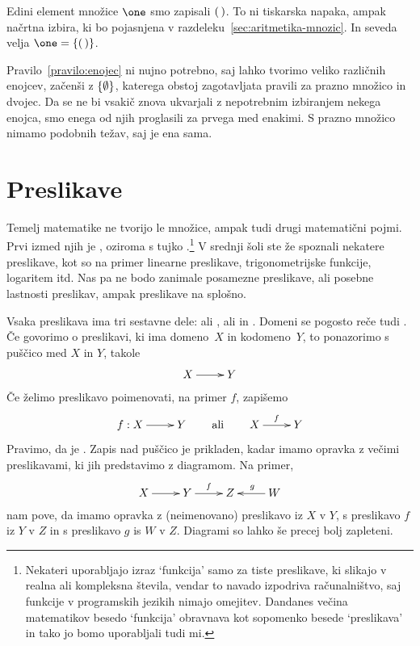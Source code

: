 Edini element množice $\one$ smo zapisali $(\,)$. To ni tiskarska napaka,
ampak načrtna izbira, ki bo pojasnjena v razdeleku~\ref{sec:aritmetika-mnozic}.
In seveda velja $\one = \set{\unit}$.

Pravilo~\ref{pravilo:enojec} ni nujno potrebno, saj lahko tvorimo veliko različnih enojcev,
začenši z $\left\{\emptyset\right\}$, katerega obstoj zagotavljata pravili za prazno množico in dvojec.
Da se ne bi vsakič znova ukvarjali z nepotrebnim izbiranjem nekega enojca, smo enega od njih
proglasili za prvega med enakimi. S prazno množico nimamo podobnih težav, saj je ena sama.

\section{Preslikave}
\label{sec:preslikave}

Temelj matematike ne tvorijo le množice, ampak tudi drugi matematični pojmi. Prvi izmed
njih je , oziroma s tujko .\footnote{Nekateri uporabljajo
  izraz `funkcija' samo za tiste preslikave, ki slikajo v realna ali kompleksna števila,
  vendar to navado izpodriva računalništvo, saj funkcije v programskih jezikih nimajo
  omejitev. Dandanes večina matematikov besedo `funkcija' obravnava kot sopomenko besede
  `preslikava' in tako jo bomo uporabljali tudi mi.} V srednji šoli ste že spoznali
nekatere preslikave, kot so na primer linearne preslikave, trigonometrijske funkcije,
logaritem itd. Nas pa ne bodo zanimale posamezne preslikave, ali posebne lastnosti
preslikav, ampak preslikave na splošno.

Vsaka preslikava ima tri sestavne dele:  ali ,
 ali  in . Domeni se pogosto reče tudi
. Če govorimo o preslikavi, ki ima domeno~$X$ in kodomeno~$Y$, to
ponazorimo s puščico med $X$ in $Y$, takole
%
\begin{equation*}
  \xymatrix{
    {X} \ar[r] &
    {Y}
  }
\end{equation*}
%
Če želimo preslikavo poimenovati, na primer $f$, zapišemo
%
\begin{equation*}
  \xymatrix{
   {f : X} \ar[r] &
    {Y}
  }
  \qquad\text{ali}\qquad
  \xymatrix{
   {X} \ar[r]^{f} &
   {Y}
  }
\end{equation*}
%
Pravimo, da je . Zapis nad puščico je prikladen, kadar
imamo opravka z večimi preslikavami, ki jih predstavimo z diagramom. Na primer,
%
\begin{equation*}
  \xymatrix{
    {X} \ar[r] &
    {Y} \ar[r]^{f} &
    {Z}  &
    {W} \ar[l]_{g}
  }
\end{equation*}
%
nam pove, da imamo opravka z (neimenovano) preslikavo iz $X$ v $Y$, s preslikavo $f$ iz
$Y$ v $Z$ in s preslikavo $g$ is $W$ v $Z$. Diagrami so lahko še precej bolj zapleteni.

